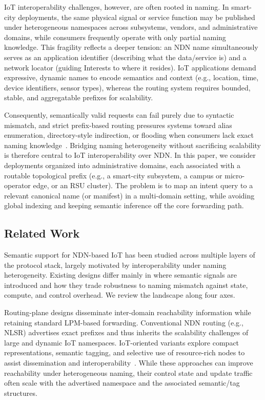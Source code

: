 \documentclass[journal]{IEEEtran}
\begin{document}
IoT interoperability challenges, however, are often rooted in naming. In smart-city deployments, the same physical signal or service function may be published under heterogeneous namespaces across subsystems, vendors, and administrative domains, while consumers frequently operate with only partial naming knowledge. This fragility reflects a deeper tension: an NDN name simultaneously serves as an application identifier (describing what the data/service is) and a network locator (guiding Interests to where it resides). IoT applications demand expressive, dynamic names to encode semantics and context (e.g., location, time, device identifiers, sensor types), whereas the routing system requires bounded, stable, and aggregatable prefixes for scalability.

Consequently, semantically valid requests can fail purely due to syntactic mismatch, and strict prefix-based routing pressures systems toward alias enumeration, directory-style indirection, or flooding when consumers lack exact naming knowledge~\cite{amadeo2025saf,dt_vndn_semantic,grewe2018sodi}. Bridging naming heterogeneity without sacrificing scalability is therefore central to IoT interoperability over NDN. In this paper, we consider deployments organized into administrative domains, each associated with a routable topological prefix (e.g., a smart-city subsystem, a campus or micro-operator edge, or an RSU cluster). The problem is to map an intent query to a relevant canonical name (or manifest) in a multi-domain setting, while avoiding global indexing and keeping semantic inference off the core forwarding path.

\subsection{Related Work}
\label{sec:bg_related}

Semantic support for NDN-based IoT has been studied across multiple layers of the protocol stack, largely motivated by interoperability under naming heterogeneity. Existing designs differ mainly in where semantic signals are introduced and how they trade robustness to naming mismatch against state, compute, and control overhead. We review the landscape along four axes.

Routing-plane designs disseminate inter-domain reachability information while retaining standard LPM-based forwarding. Conventional NDN routing (e.g., NLSR) advertises exact prefixes and thus inherits the scalability challenges of large and dynamic IoT namespaces. IoT-oriented variants explore compact representations, semantic tagging, and selective use of resource-rich nodes to assist dissemination and interoperability~\cite{inf_ndn_iot}. While these approaches can improve reachability under heterogeneous naming, their control state and update traffic often scale with the advertised namespace and the associated semantic/tag structures.
\end{document}
